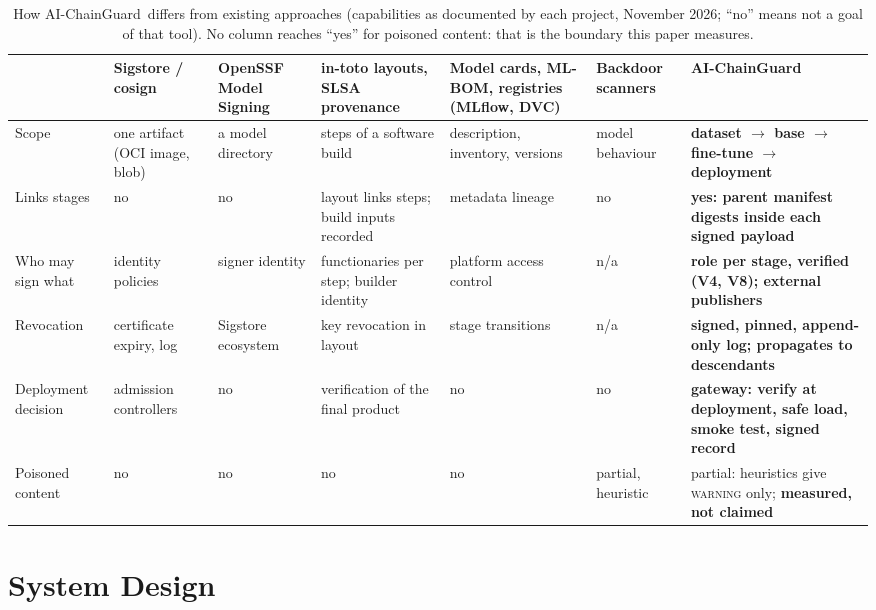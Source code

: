 \documentclass[conference]{IEEEtran}
\newcommand{\sys}{AI-ChainGuard}
\newcommand{\st}[1]{\textsc{#1}}
\begin{document}
\begin{table}[t]
\caption{How \sys\ differs from existing approaches (capabilities as documented by each project, November 2026; ``no'' means not a goal of that tool). No column reaches ``yes'' for poisoned content: that is the boundary this paper measures.}
\label{tab:compare}
\centering
\scriptsize
\setlength{\tabcolsep}{4pt}
\begin{tabular}{@{}>{\raggedright}p{2.0cm}>{\raggedright}p{1.9cm}>{\raggedright}p{1.9cm}>{\raggedright}p{2.1cm}>{\raggedright}p{2.5cm}>{\raggedright}p{1.8cm}>{\raggedright\arraybackslash}p{4.25cm}@{}}
\toprule
 & Sigstore / cosign & OpenSSF Model Signing & in-toto layouts, SLSA provenance & Model cards, ML-BOM, registries (MLflow, DVC) & Backdoor scanners & \textbf{\sys} \\
\midrule
Scope & one artifact (OCI image, blob) & a model directory & steps of a software build & description, inventory, versions & model behaviour & \textbf{dataset $\to$ base $\to$ fine-tune $\to$ deployment} \\
Links stages & no & no & layout links steps; build inputs recorded & metadata lineage & no & \textbf{yes: parent manifest digests inside each signed payload} \\
Who may sign what & identity policies & signer identity & functionaries per step; builder identity & platform access control & n/a & \textbf{role per stage, verified (V4, V8); external publishers} \\
Revocation & certificate expiry, log & Sigstore ecosystem & key revocation in layout & stage transitions & n/a & \textbf{signed, pinned, append-only log; propagates to descendants} \\
Deployment decision & admission controllers & no & verification of the final product & no & no & \textbf{gateway: verify at deployment, safe load, smoke test, signed record} \\
Poisoned content & no & no & no & no & partial, heuristic & partial: heuristics give \st{warning} only; \textbf{measured, not claimed} \\
\bottomrule
\end{tabular}
\end{table}

\section{System Design}\label{sec:design}
\end{document}
